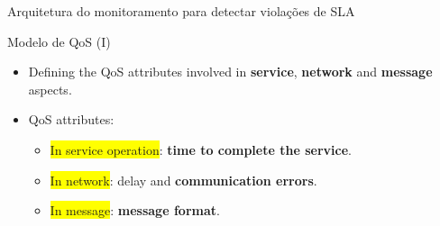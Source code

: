 \documentclass[xcolor=svgnames]{beamer}
\begin{document}
\begin{frame}{Arquitetura do monitoramento para detectar violações de SLA}
    \end{frame}

  \begin{frame}{ Modelo de QoS  (I)}
    \begin{itemize} %
	\item Defining the QoS attributes involved in \textbf{service}, \textbf{network} and \textbf{message} aspects.
	\item QoS attributes:
	    \begin{itemize}
	      \item <2->\colorbox{yellow}{In service operation}: \textbf{time to complete the service}.
	      \item <3->\colorbox{yellow}{In network}: delay and \textbf{communication errors}.
	      \item <4->\colorbox{yellow}{In message}: \textbf{message format}.
	    \end{itemize}
    \end{itemize}
  \end{frame}
\end{document}
